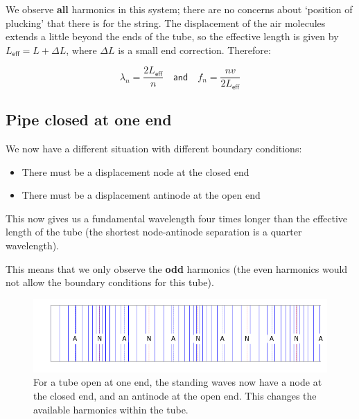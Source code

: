 \documentclass[
]{book}
\providecommand{\tightlist}{%
  \setlength{\itemsep}{0pt}\setlength{\parskip}{0pt}}
\begin{document}
We observe \textbf{all} harmonics in this system; there are no concerns about `position of plucking' that there is for the string. The displacement of the air molecules extends a little beyond the ends of the tube, so the effective length is given by \(L_\textsf{eff} = L + \Delta L\), where \(\Delta L\) is a small end correction. Therefore:

\begin{equation}
\lambda_n = \frac{2L_\textsf{eff}}{n} \quad \textsf{and} \quad f_n = \frac{nv}{2L_\textsf{eff}}
\end{equation}

\hypertarget{pipe-closed-at-one-end}{%
\subsection{Pipe closed at one end}\label{pipe-closed-at-one-end}}

We now have a different situation with different boundary conditions:

\begin{itemize}
\tightlist
\item
  There must be a displacement node at the closed end
\item
  There must be a displacement antinode at the open end
\end{itemize}

This now gives us a fundamental wavelength four times longer than the effective length of the tube (the shortest node-antinode separation is a quarter wavelength).

This means that we only observe the \textbf{odd} harmonics (the even harmonics would not allow the boundary conditions for this tube).

\begin{figure}

{\centering \includegraphics[width=0.7\linewidth]{visualisations/ch10-longitudinal-standingwave-n6open} 

}

\caption{For a tube open at one end, the standing waves now have a node at the closed end, and an antinode at the open end. This changes the available harmonics within the tube.}\label{fig:ch10-waves-opentube}
\end{figure}
\end{document}
